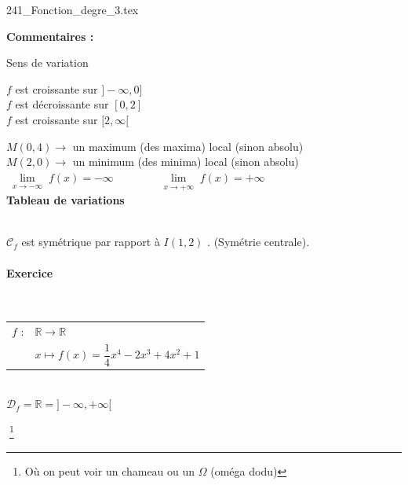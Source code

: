 \vspace*{-2cm}
\centerline{ {241_Fonction_degre_3.tex} }

\textbf{Commentaires :}

 Sens de variation 

$f$ est croissante sur $]- \infty, 0]$ \\
$f$ est décroissante sur $[0, 2]$ \\
$f$ est croissante sur $[2, \infty[$ \\

\smallskip 

$M(0,4) \longrightarrow $ un maximum (des maxima) local (sinon absolu) \\
$M(2,0) \longrightarrow $ un minimum (des minima) local (sinon absolu)\\

$\lim\limits_{\substack{x \to -\infty}} f(x) = -\infty \qquad \qquad \lim\limits_{\substack{x \to +\infty}} f(x) = +\infty $ \\


\textbf{Tableau de variations}\\

\\

$\mathscr{C}_f$ est symétrique par rapport à $I(1,2)$ . (Symétrie centrale). 

\newpage

\paragraph{Exercice }~\\

\begin{tabular}{l@{$\;$ }l}
 $f$ : & $ \mathbb{R} \longrightarrow \mathbb{R}$\\
       & $ x \longmapsto f(x) = \dfrac{1}{4}x^4 -2x^3 +4x^2 +1$ 
\end{tabular}\\

$\mathscr{D}_f = \mathbb{R} = ] -\infty, +\infty [ $ 

\bigskip 

\hspace*{7.5cm}$\;$\footnote{Où on peut voir un chameau ou un $\Omega$ (oméga dodu)}

